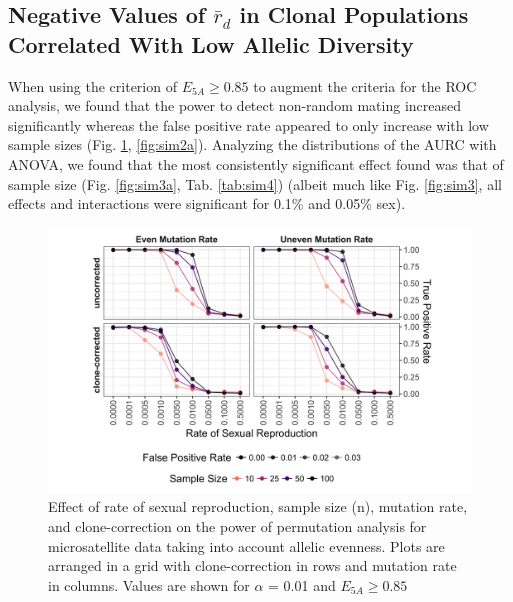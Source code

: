 \documentclass[double,11pt]{beavtex}
\begin{document}
  \subsection{\texorpdfstring{Negative Values of \(\bar{r}_d\) in Clonal
  Populations Correlated With Low Allelic
  Diversity}{Negative Values of \textbackslash{}bar\{r\}\_d in Clonal Populations Correlated With Low Allelic Diversity}}\label{negative-values-of-barr_d-in-clonal-populations-correlated-with-low-allelic-diversity}
  
  When using the criterion of \(E_{5A} \geq 0.85\) to augment the criteria
  for the ROC analysis, we found that the power to detect non-random
  mating increased significantly whereas the false positive rate appeared
  to only increase with low sample sizes (Fig. \ref{fig:sim4a},
  \ref{fig:sim2a}). Analyzing the distributions of the AURC with ANOVA, we
  found that the most consistently significant effect found was that of
  sample size (Fig. \ref{fig:sim3a}, Tab. \ref{tab:sim4}) (albeit much
  like Fig. \ref{fig:sim3}, all effects and interactions were significant
  for 0.1\% and 0.05\% sex).
  
  \begin{figure}
  
  {\centering \includegraphics[width=1\linewidth]{figure/simulations/ssr_power_ea} 
  
  }
  
  \caption[Effect of rate of sexual reproduction, sample size, mutation rate,
  and clone-correction on the power of permutation analysis for microsatellite
  data taking into account allelic evenness.]{Effect of rate of sexual reproduction, sample size (n), mutation rate,
  and clone-correction on the power of permutation analysis for
  microsatellite data taking into account allelic evenness. Plots are
  arranged in a grid with clone-correction in rows and mutation rate in
  columns. Values are shown for \(\alpha\) = 0.01 and \(E_{5A} \geq 0.85\)}\label{fig:sim4a}
  \end{figure}
  
\end{document}
